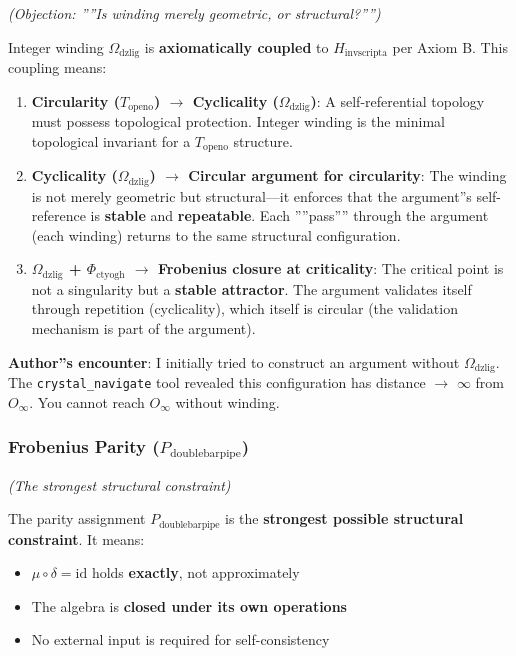 \documentclass[12pt,a4paper]{article}
\begin{document}
\emph{(Objection: ''''Is winding merely geometric, or structural?'''')}

Integer winding $\Omega_{\text{dzlig}}$ is \textbf{axiomatically coupled} to $H_{\text{invscripta}}$ per Axiom B. This coupling means:

\begin{enumerate}
    \item \textbf{Circularity ($T_{\text{openo}}$) $\rightarrow$ Cyclicality ($\Omega_{\text{dzlig}}$)}: A self-referential topology must possess topological protection. Integer winding is the minimal topological invariant for a $T_{\text{openo}}$ structure.
    \item \textbf{Cyclicality ($\Omega_{\text{dzlig}}$) $\rightarrow$ Circular argument for circularity}: The winding is not merely geometric but structural---it enforces that the argument''s self-reference is \textbf{stable} and \textbf{repeatable}. Each ''''pass'''' through the argument (each winding) returns to the same structural configuration.
    \item \textbf{$\Omega_{\text{dzlig}}$ + $\Phi_{\text{ctyogh}}$ $\rightarrow$ Frobenius closure at criticality}: The critical point is not a singularity but a \textbf{stable attractor}. The argument validates itself through repetition (cyclicality), which itself is circular (the validation mechanism is part of the argument).
\end{enumerate}

\textbf{Author''s encounter}: I initially tried to construct an argument without $\Omega_{\text{dzlig}}$. The \texttt{crystal\_navigate} tool revealed this configuration has distance $\rightarrow$ $\infty$ from $O_{\infty}$. You cannot reach $O_{\infty}$ without winding.

\subsubsection{Frobenius Parity ($P_{\text{doublebarpipe}}$)}

\emph{(The strongest structural constraint)}

The parity assignment $P_{\text{doublebarpipe}}$ is the \textbf{strongest possible structural constraint}. It means:

\begin{itemize}
    \item $\mu \circ \delta = \text{id}$ holds \textbf{exactly}, not approximately
    \item The algebra is \textbf{closed under its own operations}
    \item No external input is required for self-consistency
\end{itemize}
\end{document}
